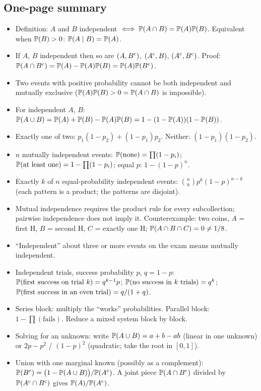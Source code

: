 \subsection{One-page summary}

\begin{itemize}[nosep]
\item Definition: $A$ and $B$ independent $\iff \mathbb{P}(A \cap B) = \mathbb{P}(A)\mathbb{P}(B)$. Equivalent when $\mathbb{P}(B) > 0$: $\mathbb{P}(A \mid B) = \mathbb{P}(A)$.
\item If $A$, $B$ independent then so are $(A, B^{\mathrm{c}})$, $(A^{\mathrm{c}}, B)$, $(A^{\mathrm{c}}, B^{\mathrm{c}})$. Proof: $\mathbb{P}(A \cap B^{\mathrm{c}}) = \mathbb{P}(A) - \mathbb{P}(A)\mathbb{P}(B) = \mathbb{P}(A)\mathbb{P}(B^{\mathrm{c}})$.
\item Two events with positive probability cannot be both independent and mutually exclusive ($\mathbb{P}(A)\mathbb{P}(B) > 0 = \mathbb{P}(A \cap B)$ is impossible).
\item For independent $A$, $B$: $\mathbb{P}(A \cup B) = \mathbb{P}(A) + \mathbb{P}(B) - \mathbb{P}(A)\mathbb{P}(B) = 1 - (1-\mathbb{P}(A))(1-\mathbb{P}(B))$.
\item Exactly one of two: $p_1(1-p_2) + (1-p_1)p_2$. Neither: $(1-p_1)(1-p_2)$.
\item $n$ mutually independent events: $\mathbb{P}(\text{none}) = \prod(1-p_i)$; $\mathbb{P}(\text{at least one}) = 1 - \prod(1-p_i)$; equal $p$: $1 - (1-p)^n$.
\item Exactly $k$ of $n$ equal-probability independent events: $\binom{n}{k}p^k(1-p)^{n-k}$ (each pattern is a product; the patterns are disjoint).
\item Mutual independence requires the product rule for every subcollection; pairwise independence does not imply it. Counterexample: two coins, $A$ = first H, $B$ = second H, $C$ = exactly one H; $\mathbb{P}(A \cap B \cap C) = 0 \ne 1/8$.
\item ``Independent'' about three or more events on the exam means mutually independent.
\item Independent trials, success probability $p$, $q = 1-p$: $\mathbb{P}(\text{first success on trial } k) = q^{k-1}p$; $\mathbb{P}(\text{no success in } k \text{ trials}) = q^k$; $\mathbb{P}(\text{first success in an even trial}) = q/(1+q)$.
\item Series block: multiply the ``works'' probabilities. Parallel block: $1 - \prod(\text{fails})$. Reduce a mixed system block by block.
\item Solving for an unknown: write $\mathbb{P}(A \cup B) = a + b - ab$ (linear in one unknown) or $2p - p^2$ / $(1-p)^2$ (quadratic; take the root in $[0,1]$).
\item Union with one marginal known (possibly as a complement): $\mathbb{P}(B^{\mathrm{c}}) = \bigl(1 - \mathbb{P}(A \cup B)\bigr)/\mathbb{P}(A^{\mathrm{c}})$. A joint piece $\mathbb{P}(A \cap B^{\mathrm{c}})$ divided by $\mathbb{P}(A^{\mathrm{c}} \cap B^{\mathrm{c}})$ gives $\mathbb{P}(A)/\mathbb{P}(A^{\mathrm{c}})$.

\end{itemize}
